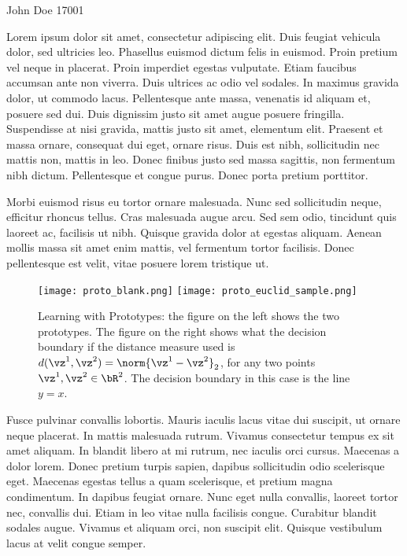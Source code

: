 \documentclass[a4paper,11pt]{article}
\begin{document}
								{John Doe}      						           		%
								{17001}																		%

\begin{mlsolution}


Lorem ipsum dolor sit amet, consectetur adipiscing elit. Duis feugiat vehicula dolor, sed ultricies leo. Phasellus euismod dictum felis in euismod. Proin pretium vel neque in placerat. Proin imperdiet egestas vulputate. Etiam faucibus accumsan ante non viverra. Duis ultrices ac odio vel sodales. In maximus gravida dolor, ut commodo lacus. Pellentesque ante massa, venenatis id aliquam et, posuere sed dui. Duis dignissim justo sit amet augue posuere fringilla. Suspendisse at nisi gravida, mattis justo sit amet, elementum elit. Praesent et massa ornare, consequat dui eget, ornare risus. Duis est nibh, sollicitudin nec mattis non, mattis in leo. Donec finibus justo sed massa sagittis, non fermentum nibh dictum. Pellentesque et congue purus. Donec porta pretium porttitor.

Morbi euismod risus eu tortor ornare malesuada. Nunc sed sollicitudin neque, efficitur rhoncus tellus. Cras malesuada augue arcu. Sed sem odio, tincidunt quis laoreet ac, facilisis ut nibh. Quisque gravida dolor at egestas aliquam. Aenean mollis massa sit amet enim mattis, vel fermentum tortor facilisis. Donec pellentesque est velit, vitae posuere lorem tristique ut.
\begin{figure}[th]%
\centering
\texttt{[image: proto\_blank.png]}%
\hfill
\texttt{[image: proto\_euclid\_sample.png]}%
\caption{Learning with Prototypes: the figure on the left shows the two prototypes. The figure on the right shows what the decision boundary if the distance measure used is $d(\vz^1,\vz^2) = \norm{\vz^1-\vz^2}_2$, for any two points $\vz^1,\vz^2 \in \bR^2$. The decision boundary in this case is the line $y = x$.}%
\label{fig:proto}%
\end{figure}
Fusce pulvinar convallis lobortis. Mauris iaculis lacus vitae dui suscipit, ut ornare neque placerat. In mattis malesuada rutrum. Vivamus consectetur tempus ex sit amet aliquam. In blandit libero at mi rutrum, nec iaculis orci cursus. Maecenas a dolor lorem. Donec pretium turpis sapien, dapibus sollicitudin odio scelerisque eget. Maecenas egestas tellus a quam scelerisque, et pretium magna condimentum. In dapibus feugiat ornare. Nunc eget nulla convallis, laoreet tortor nec, convallis dui. Etiam in leo vitae nulla facilisis congue. Curabitur blandit sodales augue. Vivamus et aliquam orci, non suscipit elit. Quisque vestibulum lacus at velit congue semper.

\end{mlsolution}
\end{document}
